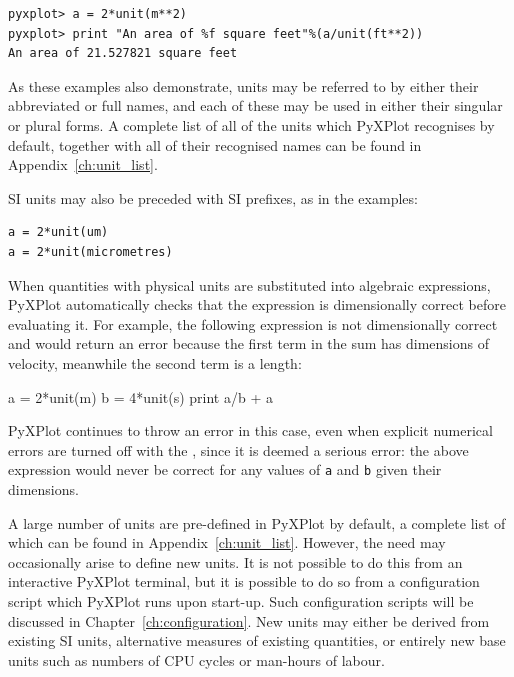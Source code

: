 \begin{verbatim}
pyxplot> a = 2*unit(m**2)
pyxplot> print "An area of %f square feet"%(a/unit(ft**2))
An area of 21.527821 square feet
\end{verbatim}

\noindent As these examples also demonstrate, units may be referred to by either
their abbreviated or full names, and each of these may be used in either their
singular or plural forms.  A complete list of all of the units which PyXPlot
recognises by default, together with all of their recognised names can be found
in Appendix~\ref{ch:unit_list}.

SI units may also be preceded with SI prefixes, as in
the examples:

\begin{verbatim}
a = 2*unit(um)
a = 2*unit(micrometres)
\end{verbatim}

When quantities with physical units are substituted into algebraic expressions,
PyXPlot automatically checks that the expression is dimensionally correct
before evaluating it. For example, the following expression is not
dimensionally correct and would return an error because the first term in the
sum has dimensions of velocity, meanwhile the second term is a length:

\begin{dontdo}
a = 2*unit(m)\newline
b = 4*unit(s)\newline
print a/b + a
\end{dontdo}

\noindent PyXPlot continues to throw an error in this case, even when explicit
numerical errors are turned off with the ,
since it is deemed a serious error: the above expression would never be correct
for any values of {\tt a} and {\tt b} given their dimensions.

A large number of units are pre-defined in PyXPlot by default, a complete list
of which can be found in Appendix~\ref{ch:unit_list}.  However, the need may
occasionally arise to define new units. It is not possible to do this from an
interactive PyXPlot terminal, but it is possible to do so from a configuration
script which PyXPlot runs upon start-up. Such configuration scripts will be
discussed in Chapter~\ref{ch:configuration}. New units may either be derived
from existing SI units, alternative measures of existing quantities, or
entirely new base units such as numbers of CPU cycles or man-hours of labour.

